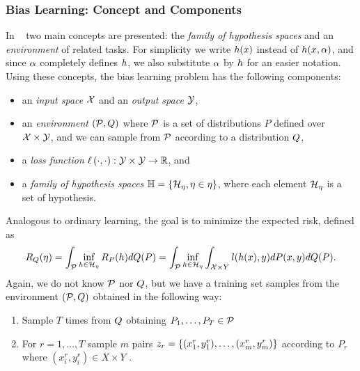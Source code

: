 

\subsubsection*{Bias Learning: Concept and Components}
In ~\cite{baxter2000model} two main concepts are presented: the \emph{family of hypothesis spaces} and an \emph{environment} of related tasks. 
For simplicity we write $h(x)$  instead of $h(x, \alpha)$, and since $\alpha$ completely defines $h$, we also substitute $\alpha$ by $h$ for an easier notation.
Using these concepts, the bias learning problem has the following components:
\begin{itemize}
    \item an \emph{input space} $\mathcal{X}$ and an \emph{output space} $\mathcal{Y}$,
    \item an \emph{environment} $(\mathcal{P}, Q)$ where $\mathcal{P}$ is a set of distributions $P$ defined over $\mathcal{X} \times \mathcal{Y}$, and we can sample from $\mathcal{P}$ according to a distribution $Q$,
    \item a \emph{loss function} $\ell\left( \cdot, \cdot\right):\mathcal{Y} \times \mathcal{Y} \to \mathbb{R}$, and
    \item a \emph{family of hypothesis spaces} $\mathbb{H} = \left\{\mathcal{H}_\eta, \eta \in \eta\right\}$, where each element $\mathcal{H}_\eta$ is a set of hypothesis.
\end{itemize}
Analogous to ordinary learning, the goal is to minimize the expected risk, defined as
\begin{equation}\label{eq:biaslearn_exprisk}
    \bexprisk(\eta) = \int_{\bprobspace} \inf_{\hypf \in \hypspace_\eta} \risk_P(\hypf) d\bdistf(P) = \int_{\bprobspace} \inf_{\hypf \in \hypspace_\eta} \int_{\Xspace \times Y} l(h(x), y) dP(x, y) d\bdistf(P).
\end{equation}
Again, we do not know $\mathcal{P}$ nor $Q$, but we have a training set samples from the environment $(\mathcal{P}, Q)$ obtained in the following way:
\begin{enumerate}
    \item Sample $T$ times from $Q$ obtaining $P_1, \ldots, P_T \in \mathcal{P}$
    \item For $r=1, \ldots, T$ sample $m$ pairs $z_r = \{(x_1^r, y_1^r), \ldots, (x_m^r, y_m^r)\}$ according to $P_r$ where $(x_i^r, y_i^r) \in X \times Y$ .
\end{enumerate}
